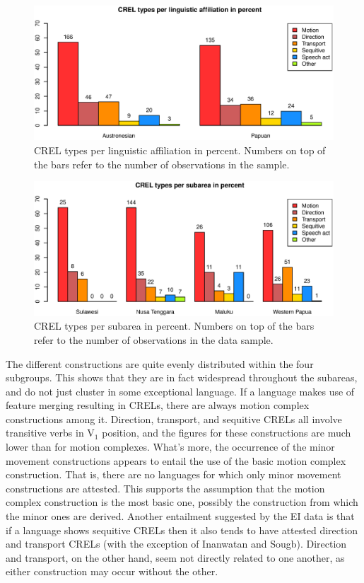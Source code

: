 \begin{figure}
\includegraphics[width=\columnwidth]{figures/CREL_Family.eps}
\caption[CREL types per linguistic affiliation in percent]{CREL types per linguistic affiliation in percent. Numbers on top of the bars refer to the number of observations in the sample.}\label{fig:crel-family}
\end{figure}
\begin{figure}
\includegraphics[width=\columnwidth]{figures/CREL_Group.eps}
\caption[CREL types per subarea in percent]{CREL types per subarea in percent. Numbers on top of the bars refer to the number of observations in the data sample.}\label{fig:crel-group}
\end{figure}


The different constructions are quite evenly distributed within the four subgroups. This shows that they are in fact widespread throughout the subareas, and do not just cluster in some exceptional language. If a language makes use of feature merging resulting in CRELs, there are always motion complex constructions among it. Direction, transport, and sequitive CRELs all involve transitive verbs in V$_1$ position, and the figures for these constructions are much lower than for motion complexes. What's more, the occurrence of the minor movement constructions appears to entail the use of the basic motion complex construction. That is, there are no languages for which only minor movement constructions are attested. This supports the assumption that the motion complex construction is the most basic one, possibly the construction from which the minor ones are derived. Another entailment suggested by the EI data is that if a language shows sequitive CRELs then it also tends to have attested direction and transport CRELs (with the exception of Inanwatan and Sougb). Direction and transport, on the other hand, seem not directly related to one another, as either construction may occur without the other.


